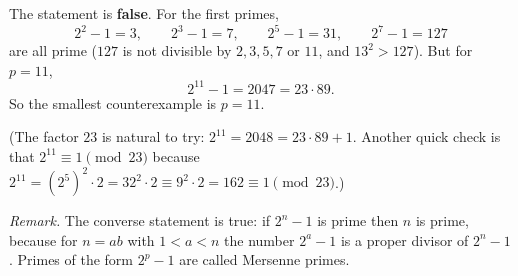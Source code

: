The statement is \textbf{false}. For the first primes,
\[2^2-1=3,\qquad 2^3-1=7,\qquad 2^5-1=31,\qquad 2^7-1=127\]
are all prime ($127$ is not divisible by $2,3,5,7$ or $11$, and $13^2>127$). But for $p=11$,
\[2^{11}-1=2047=23\cdot89 .\]
So the smallest counterexample is $\boxed{p=11}$.

(The factor $23$ is natural to try: $2^{11}=2048=23\cdot89+1$. Another quick check is that $2^{11}\equiv1\pmod{23}$ because $2^{11}=\left(2^{5}\right)^2\cdot2=32^2\cdot2\equiv9^2\cdot2=162\equiv1\pmod{23}$.)

\emph{Remark.} The converse statement is true: if $2^n-1$ is prime then $n$ is prime, because for $n=ab$ with $1<a<n$ the number $2^a-1$ is a proper divisor of $2^n-1$. Primes of the form $2^p-1$ are called Mersenne primes.
